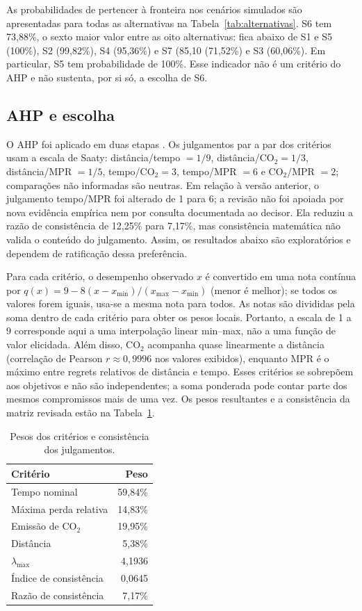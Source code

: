 \documentclass[conference]{IEEEtran}
\begin{document}
As probabilidades de pertencer à fronteira nos cenários simulados são
apresentadas para todas as alternativas na Tabela~\ref{tab:alternativas}.
S6 tem 73,88\%, o sexto maior valor entre as oito alternativas: fica abaixo de
S1 e S5 (100\%), S2 (99,82\%), S4 (95,36\%) e S7 (85,10%
(71,52\%) e S3 (60,06\%). Em particular, S5 tem probabilidade de 100\%.
Esse indicador não é um critério do AHP e não sustenta, por si só, a escolha
de S6.

\subsection{AHP e escolha}

O AHP foi aplicado em duas etapas \cite{saaty}. Os julgamentos par a par
dos critérios usam a escala de Saaty: distância/tempo $=1/9$,
distância/CO$_2=1/3$, distância/MPR $=1/5$, tempo/CO$_2=3$,
tempo/MPR $=6$ e CO$_2$/MPR $=2$; comparações não informadas são
neutras. Em relação à versão anterior, o julgamento tempo/MPR foi alterado
de 1 para 6; a revisão não foi apoiada por nova evidência empírica nem por
consulta documentada ao decisor. Ela reduziu a razão de consistência de
12,25\% para 7,17\%, mas consistência matemática não valida o conteúdo do
julgamento. Assim, os resultados abaixo são exploratórios e dependem de
ratificação dessa preferência.

Para cada critério, o desempenho observado $x$ é convertido em uma nota
contínua por $q(x)=9-8(x-x_{\min})/(x_{\max}-x_{\min})$ (menor é melhor);
se todos os valores forem iguais, usa-se a mesma nota para todos. As notas
são divididas pela soma dentro de cada critério para obter os pesos locais.
Portanto, a escala de 1 a 9 corresponde aqui a uma interpolação linear
min--max, não a uma função de valor elicidada. Além disso, CO$_2$ acompanha
quase linearmente a distância (correlação de Pearson $r\approx0{,}9996$ nos
valores exibidos), enquanto MPR é o máximo entre regrets relativos de
distância e tempo. Esses critérios se sobrepõem aos objetivos e não são
independentes; a soma ponderada pode contar parte dos mesmos compromissos mais
de uma vez. Os pesos resultantes e a consistência da matriz revisada estão na
Tabela~\ref{tab:pesos}.

\begin{table}[t]
\centering
\caption{Pesos dos critérios e consistência dos julgamentos.}
\label{tab:pesos}
\small
\begin{tabular}{lr}
\toprule
Critério & Peso\\
\midrule
Tempo nominal & 59,84\%\\
Máxima perda relativa & 14,83\%\\
Emissão de CO$_2$ & 19,95\%\\
Distância & 5,38\%\\
\midrule
$\lambda_{\max}$ & 4,1936\\
Índice de consistência & 0,0645\\
Razão de consistência & 7,17\%\\
\bottomrule
\end{tabular}
\end{table}
\end{document}
